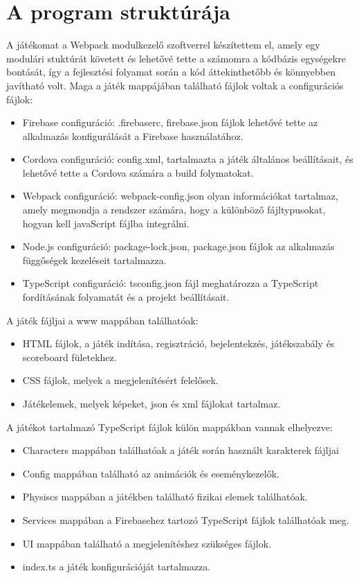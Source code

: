\documentclass[12pt, a4paper]{report}
\theoremstyle{definition}
\begin{document}
	\section{A program struktúrája}
	A játékomat a Webpack modulkezelő szoftverrel készítettem el, amely egy modulári stuktúrát követett és lehetővé tette a számomra a kódbázis egységekre bontását, így a fejlesztési folyamat során a kód áttekinthetőbb és könnyebben javítható volt. 
	Maga a játék mappájában található fájlok voltak a configurációs fájlok:
	\begin{itemize} 
		\item Firebase configuráció: .firebaserc, firebase.json fájlok lehetővé tette az alkalmazás konfigurálását a Firebase használatához.
		\item Cordova configuráció: config.xml, tartalmazta a játék általános beállításait, és lehetővé tette a Cordova számára a build folymatokat. 
		\item Webpack configuráció: webpack-config.json olyan információkat tartalmaz, amely megmondja a rendszer számára, hogy a különböző fájltypusokat, hogyan kell javaScript fájlba integrálni.
		\item Node.js configuráció: package-lock.json, package.json fájlok az alkalmazás függőségek kezeléseit tartalmazza.
		\item TypeScript configuráció: tsconfig.json fájl meghatározza a TypeScript fordításának folyamatát és a projekt beállításait.
	\end{itemize}

	A játék fájljai a www mappában találhatóak:
	\begin{itemize} 
		\item HTML fájlok, a játék indítása, regisztráció, bejelentekzés, játékszabály és scoreboard fületekhez.
		\item CSS fájlok, melyek a megjelenítésért felelősek.
		\item Játékelemek, melyek képeket, json és xml fájlokat tartalmaz.
	\end{itemize}
	A játékot tartalmazó TypeScript fájlok külön mappákban vannak elhelyezve:
	\begin{itemize} 
		\item Characters mappában találhatóak a játék során használt karakterek fájljai
		\item Config mappában található az animációk és eseménykezelők.
		\item Physiscs mappában a játékben található fizikai elemek találhatóak.
		\item Services mappában a Firebasehez tartozó TypeScript fájlok találhatóak meg.
		\item UI mappában található a megjelenítéshez szükséges fájlok.
		\item index.ts a játék konfigurációját tartalmazza.
	\end{itemize}
\end{document}
